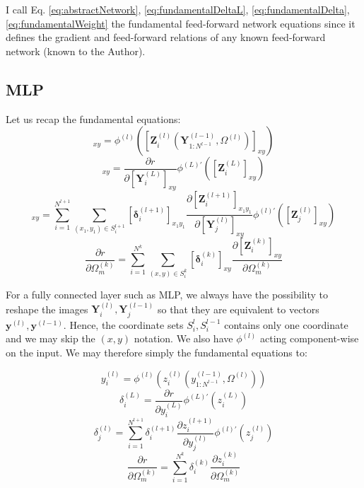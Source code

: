 \documentclass[a4paper,10pt]{article}
\theoremstyle{definition}
\begin{document}
I call Eq. \ref{eq:abstractNetwork}, \ref{eq:fundamentalDeltaL}, \ref{eq:fundamentalDelta}, \ref{eq:fundamentalWeight} the fundamental feed-forward network equations since it defines the gradient and feed-forward relations of any known feed-forward network (known to the Author).

\subsection{MLP}

Let us recap the fundamental equations:
\begin{equation}
[\pmb{Y}_i^{(l)}]_{xy} = \phi^{(l)}([\pmb{Z}^{(l)}_{i}(\pmb{Y}^{(l-1)}_{1:N^{l-1}}, \Omega^{(l)})]_{xy})
\end{equation}
\begin{equation}
[\pmb{\delta}_i^{(L)}]_{xy} = \frac{\partial r}{\partial [\pmb{Y}^{(L)}_i]_{xy}}\phi^{(L)'}([\pmb{Z}^{(L)}_{i}]_{xy})
\end{equation}
\begin{equation}
[\pmb{\delta}_j^{(l)}]_{xy} = \sum_{i = 1}^{N^{l+1}}\sum_{(x_1,y_1) \in S^{l+1}_i} [\pmb{\delta}^{(l+1)}_i]_{x_1y_1} \frac{\partial [\pmb{Z}^{(l + 1)}_{i}]_{x_1y_1}}{\partial [\pmb{Y}^{(l)}_j]_{xy}} \phi^{(l)'}([\pmb{Z}^{(l)}_{j}]_{xy})
\end{equation}
\begin{equation}
\frac{\partial r}{\partial \Omega^{(k)}_m} = \sum_{i = 1}^{N^{k}}\sum_{(x,y) \in S^{k}_i} [\pmb{\delta}_i^{(k)}]_{xy} \frac{\partial [\pmb{Z}^{(k)}_i]_{xy}}{\partial \Omega^{(k)}_m}
\end{equation}

For a fully connected layer such as MLP, we always have the possibility to reshape the images $\pmb{Y}_i^{(l)}, \pmb{Y}_j^{(l-1)}$ so that they are equivalent to vectors $\pmb{y}^{(l)}, \pmb{y}^{(l-1)}$. Hence, the coordinate sets $S_i^{l}, S_i^{l-1}$ contains only one coordinate and we may skip the $(x,y)$ notation. We also have $\phi^{(l)}$ acting component-wise on the input. We may therefore simply the fundamental equations to:

\begin{equation}
y_i^{(l)} = \phi^{(l)}(z^{(l)}_{i}(y^{(l-1)}_{1:N^{l-1}}, \Omega^{(l)}))
\end{equation}
\begin{equation}
\delta_i^{(L)} = \frac{\partial r}{\partial y^{(L)}_i}\phi^{(L)'}(z^{(L)}_{i})
\end{equation}
\begin{equation}
\delta_j^{(l)} = \sum_{i = 1}^{N^{l+1}} \delta^{(l+1)}_i \frac{\partial z^{(l + 1)}_{i}}{\partial y^{(l)}_j} \phi^{(l)'}(z^{(l)}_{j})
\end{equation}
\begin{equation}
\frac{\partial r}{\partial \Omega^{(k)}_m} = \sum_{i = 1}^{N^{k}}\delta_i^{(k)} \frac{\partial z^{(k)}_i}{\partial \Omega^{(k)}_m}
\end{equation}
\end{document}
